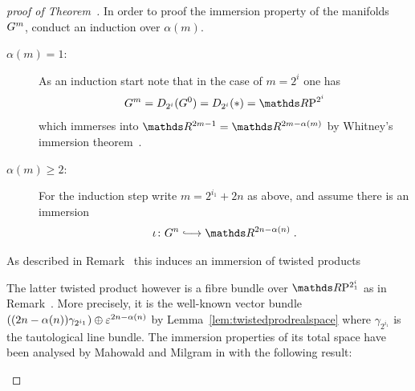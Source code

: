 \begin{proof}[proof of
  Theorem~]
  In order to proof the immersion property of the manifolds $G^{m}$,
  conduct an induction over $\alpha(m)$.
  \begin{description}
  \item[$\alpha(m)=1$:]
    As an induction start note that in the case of $m=2^i$ one has
    \begin{gather*}
      \G m
      =\Twistedprod{2^i}{\G 0}
      =\Twistedprod{2^i}{\pt}
      =\RP{2^i}
    \end{gather*}
    which immerses into $\R^{2m-1}=\R^{2m-\alpha(m)}$ by
    Whitney's immersion theorem~\cite{whitneyimmersiontheorem}.
  \item[$\alpha(m)\geq2$:]
    For the induction step write $m=2^{i_1}+2n$ as above, and assume
    there is an immersion
    \begin{gather*}
      \iota\colon\G n \immlongto \R^{2n-\alpha(n)}
      \;.
    \end{gather*}
  \end{description}
  As described in
  Remark~
  this induces an immersion of twisted products
  \begin{center}
  \end{center}
  The latter twisted product however is a fibre bundle over
  $\RP{2^i_1}$ as in
  Remark~.
  More precisely, it is the well-known vector bundle
  $((2n-\alpha(n))\gamma_{2^{i_1}})\oplus\varepsilon^{2n-\alpha(n)}$
  by Lemma~\ref{lem:twistedprodrealspace} where $\gamma_{2^{i_1}}$
  is the tautological line bundle.
  The immersion properties of its total space have been analysed by
  Mahowald and Milgram in \cite{mahowald} with the following result:
  \begin{Lem}

\end{Lem}
\end{proof}
